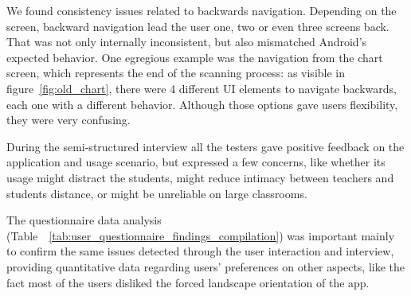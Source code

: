 We found consistency issues related to backwards navigation. Depending on the screen, backward navigation lead the user one, two or even three screens back. That was not only internally inconsistent, but also mismatched Android's expected behavior. One egregious example was the navigation from the chart screen, which represents the end of the scanning process: as visible in figure~\ref{fig:old_chart}, there were 4 different UI elements to navigate backwards, each one with a different behavior. Although those options gave users flexibility, they were very confusing.




During the semi-structured interview all the testers gave positive feedback on the application and usage scenario, but expressed a few concerns, like whether its usage might distract the students, might reduce intimacy between teachers and students distance, or might be unreliable on large classrooms.


The questionnaire data analysis (Table~~\ref{tab:user_questionnaire_findings_compilation}) was important mainly to confirm the same issues detected through the user interaction and interview, providing quantitative data regarding users' preferences on other aspects, like the fact most of the users disliked the forced landscape orientation of the app.

